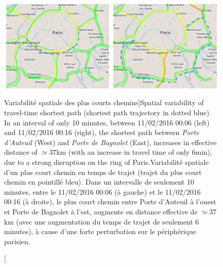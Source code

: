\begin{figure}
\includegraphics[width=\linewidth]{Figures/Final/8-1-2-fig-transportationequilibrium-fig-2.jpg}
\caption[Spatial variability of shortest paths][Variabilité spatiale des plus courts chemins]{Spatial variability of travel-time shortest path (shortest path trajectory in dotted blue). In an interval of only 10 minutes, between 11/02/2016 00:06 (left) and 11/02/2016 00:16 (right), the shortest path between \emph{Porte d'Auteuil} (West) and \emph{Porte de Bagnolet} (East), increases in effective distance of $\simeq 37$km (with an increase in travel time of only 6min), due to a strong disruption on the ring of Paris.\label{fig:fig-2}}{Variabilité spatiale d'un plus court chemin en temps de trajet (trajet du plus court chemin en pointillé bleu). Dans un intervalle de seulement 10 minutes, entre le 11/02/2016 00:06 (à gauche) et le 11/02/2016 00:16 (à droite), le plus court chemin entre Porte d'Auteuil à l'ouest et Porte de Bagnolet à l'est, augmente en distance effective de $\simeq 37$km (avec une augmentation du temps de trajet de seulement 6 minutes), à cause d'une forte perturbation sur le périphérique parisien.\label{fig:transportationequilibrium:fig-2}}
\end{figure}



